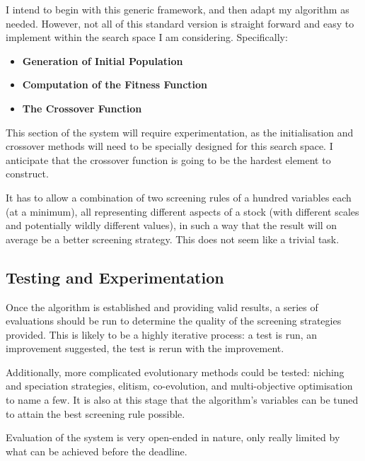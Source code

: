I intend to begin with this generic framework, and then adapt my algorithm as needed. However, not all of this standard version is straight forward and easy to implement within the search space I am considering. Specifically:
\begin{itemize}
    \item \bf Generation of Initial Population \rm 
    \item \bf Computation of the Fitness Function \rm
    \item \bf The Crossover Function \rm
\end{itemize}

This section of the system will require experimentation, as the initialisation and crossover methods will need to be specially designed for this search space. I anticipate that the crossover function is going to be the hardest element to construct. \newline

It has to allow a combination of two screening rules of a hundred variables each (at a minimum), all representing different aspects of a stock (with different scales and potentially wildly different values), in such a way that the result will on average be a better screening strategy. This does not seem like a trivial task.

\subsection{Testing and Experimentation}
Once the algorithm is established and providing valid results, a series of evaluations should be run to determine the quality of the screening strategies provided. This is likely to be a highly iterative process: a test is run, an improvement suggested, the test is rerun with the improvement. \newline

Additionally, more complicated evolutionary methods could be tested: niching and speciation strategies, elitism, co-evolution, and multi-objective optimisation to name a few. It is also at this stage that the algorithm’s variables can be tuned to attain the best screening rule possible. \newline

Evaluation of the system is very open-ended in nature, only really limited by what can be achieved before the deadline.